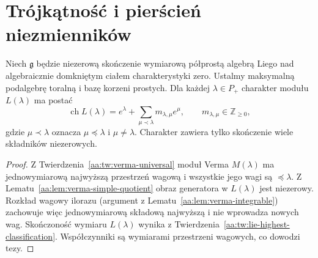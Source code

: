 \section{Trójkątność i pierścień niezmienników}

\begin{lemat}
\label{aa:lem:lie-character-triangular}
Niech $\mathfrak g$ będzie niezerową skończenie wymiarową półprostą algebrą Liego nad algebraicznie domkniętym ciałem charakterystyki zero. Ustalmy maksymalną podalgebrę toralną i bazę korzeni prostych. Dla każdej $\lambda\in P_+$ charakter modułu $L(\lambda)$ ma postać
\[
 \operatorname{ch}L(\lambda)=e^\lambda+
 \sum_{\mu\prec\lambda}m_{\lambda,\mu}e^\mu,
 \qquad m_{\lambda,\mu}\in\mathbb Z_{\ge0},
\]
gdzie $\mu\prec\lambda$ oznacza $\mu\preceq\lambda$ i $\mu\ne\lambda$. Charakter zawiera tylko skończenie wiele składników niezerowych.
\end{lemat}
\begin{proof}
Z Twierdzenia~\ref{aa:tw:verma-universal} moduł Verma $M(\lambda)$ ma jednowymiarową najwyższą przestrzeń wagową i wszystkie jego wagi są $\preceq\lambda$. Z Lematu~\ref{aa:lem:verma-simple-quotient} obraz generatora w $L(\lambda)$ jest niezerowy. Rozkład wagowy ilorazu (argument z Lematu~\ref{aa:lem:verma-integrable}) zachowuje więc jednowymiarową składową najwyższą i nie wprowadza nowych wag. Skończoność wymiaru $L(\lambda)$ wynika z Twierdzenia~\ref{aa:tw:lie-highest-classification}. Współczynniki są wymiarami przestrzeni wagowych, co dowodzi tezy.
\end{proof}

